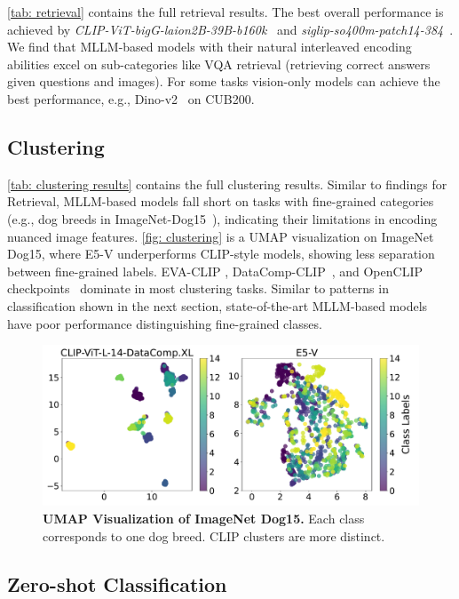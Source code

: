 \autoref{tab: retrieval} contains the full retrieval results. The best overall performance is achieved by \textit{CLIP-ViT-bigG-laion2B-39B-b160k}~\citep{cherti2023reproducible} and \textit{siglip-so400m-patch14-384}~\citep{zhai2023sigmoid}. We find that MLLM-based models with their natural interleaved encoding abilities excel on sub-categories like VQA retrieval (retrieving correct answers given questions and images). For some tasks vision-only models can achieve the best performance, e.g., Dino-v2~\citep{oquab2024dinov2} on CUB200.

\subsection{Clustering}

\autoref{tab: clustering results} contains the full clustering results. Similar to findings for Retrieval, MLLM-based models fall short on tasks with fine-grained categories (e.g., dog breeds in ImageNet-Dog15~\citep{deng2009imagenet}), indicating their limitations in encoding nuanced image features. \autoref{fig: clustering} is a UMAP visualization on ImageNet Dog15, where E5-V underperforms CLIP-style models, showing less separation between fine-grained labels. EVA-CLIP \cite{sun2023eva}, DataComp-CLIP~\citep{gadre2024datacomp}, and OpenCLIP checkpoints~\citep{cherti2023reproducible} dominate in most clustering tasks. Similar to patterns in classification shown in the next section, state-of-the-art MLLM-based models have poor performance distinguishing fine-grained classes.

\begin{figure}
\centering
\includegraphics[width=1\linewidth]{figures/clustering_plot.pdf}
\caption{\textbf{UMAP Visualization of ImageNet Dog15.} Each class corresponds to one dog breed. CLIP clusters are more distinct.}
\label{fig: clustering}
\end{figure}

\subsection{Zero-shot Classification} 
\label{subsec: classification}

